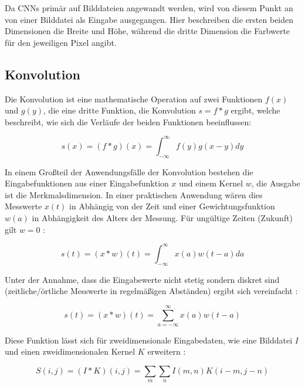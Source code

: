 
Da CNNs primär auf Bilddateien angewandt werden, wird von diesem Punkt an von einer Bilddatei als Eingabe ausgegangen. Hier beschreiben die ersten beiden Dimensionen die Breite und Höhe, während die dritte Dimension die Farbwerte für den jeweiligen Pixel angibt.

\subsection{Konvolution}
\label{ssec:conv}

Die Konvolution ist eine mathematische Operation auf zwei Funktionen $f(x)$ und $g(y)$, die eine dritte Funktion, die Konvolution $s = f*g$ ergibt, welche beschreibt, wie sich die Verläufe der beiden Funktionen beeinflussen:

\begin{equation}
s(x) = (f*g)(x) = \int_{-\infty}^{\infty} f(y)g(x-y)dy
\end{equation}

In einem Großteil der Anwendungsfälle der Konvolution bestehen die Eingabefunktionen aus einer Eingabefunktion $x$ und einem Kernel $w$, die Ausgabe ist die Merkmalsdimension. In einer praktischen Anwendung wären dies \bspw Messwerte $x(t)$ in Abhängig von der Zeit und einer Gewichtungsfunktion $w(a)$ in Abhängigkeit des Alters der Messung. Für ungültige Zeiten (\bspw Zukunft) gilt $w=0$ \cite[Kap.~9]{deeplearning_16}:

\begin{equation}
s(t) = (x*w)(t) = \int_{-\infty}^{\infty} x(a)w(t-a)da
\end{equation}

Unter der Annahme, dass die Eingabewerte nicht stetig sondern diskret sind (zeitliche/örtliche Messwerte in regelmäßigen Abständen) ergibt sich vereinfacht \cite[Kap.~9]{deeplearning_16}:

\begin{equation}
s(t) = (x*w)(t) = \sum_{a=-\infty}^{\infty}x(a)w(t-a)
\end{equation}

Diese Funktion lässt sich für zweidimensionale Eingabedaten, wie \zB eine Bilddatei $I$ und einen zweidimensionalen Kernel $K$ erweitern \cite[Kap.~9]{deeplearning_16}:

\begin{equation}
S(i,j) = (I*K)(i,j) = \sum_{m}\sum_{n}I(m,n)K(i-m,j-n)
\end{equation}

